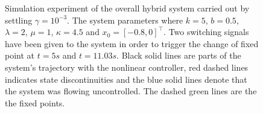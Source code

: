 %
\begin{figure}[h]
    \centering
    \caption{Simulation experiment of the overall hybrid system carried out by settling $\gamma = 10^{-3}$. The system parameters where $k = 5$, $b = 0.5$, $\lambda = 2$, $\mu = 1$, $\kappa = 4.5$ and $x_0 = [-0.8,0]^\top$. 
    Two switching signals have been given to the system in order to trigger the change of fixed point at $t = 5s$ and $t = 11.03s$. Black solid lines are parts of the system's trajectory with the nonlinear controller, red dashed lines indicates state discontinuities and the blue solid lines denote that the system was flowing uncontrolled. The dashed green lines are the the fixed points.
    }
    \label{fig:exp1}
\end{figure}
%
%

